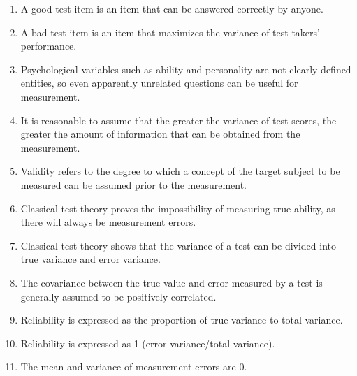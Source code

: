 \begin{enumerate}
	\item A good test item is an item that can be answered correctly by anyone.
	\item A bad test item is an item that maximizes the variance of test-takers' performance.
	\item Psychological variables such as ability and personality are not clearly defined entities, so even apparently unrelated questions can be useful for measurement.
	\item It is reasonable to assume that the greater the variance of test scores, the greater the amount of information that can be obtained from the measurement.
	\item Validity refers to the degree to which a concept of the target subject to be measured can be assumed prior to the measurement.
	\item Classical test theory proves the impossibility of measuring true ability, as there will always be measurement errors.
	\item Classical test theory shows that the variance of a test can be divided into true variance and error variance.
	\item The covariance between the true value and error measured by a test is generally assumed to be positively correlated.
	\item Reliability is expressed as the proportion of true variance to total variance.
	\item Reliability is expressed as 1-(error variance/total variance).
	\item The mean and variance of measurement errors are 0.
\end{enumerate}

